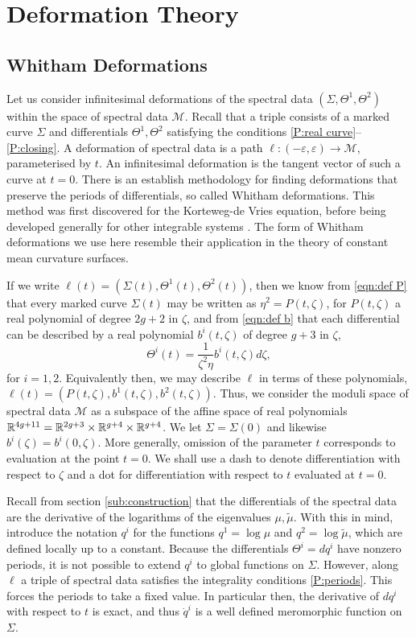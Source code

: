 
\section{Deformation Theory}
\label{sec:Deformation Theory}

\subsection{Whitham Deformations}
Let us consider infinitesimal deformations of the spectral data $(Σ,Θ^1,Θ^2)$  within the space of spectral data $\mathcal{M}$. Recall that a triple consists of a marked curve $Σ$ and differentials $Θ^1, Θ^2$ satisfying the conditions \ref{P:real curve}--\ref{P:closing}.
A deformation of spectral data is a path $\ell:(-ε,ε) \to \mathcal{M}$, parameterised by $t$. An infinitesimal deformation is the tangent vector of such a curve at $t=0$.
There is an establish methodology for finding deformations that preserve the periods of differentials, so called Whitham deformations. This method was first discovered for the Korteweg-de Vries equation\cite{Flaschka1980,Lax1983}, before being developed generally for other integrable systems \cite{Krichever1995}. The form of Whitham deformations we use here resemble their application in the theory of constant mean curvature surfaces\cite{Kilian2015a,Carberry2016}.

If we write $\ell(t) = (Σ(t),Θ^1(t),Θ^2(t))$, then we know from \eqref{eqn:def P} that every marked curve $Σ(t)$ may be written as $η^2 = P(t,ζ)$, for $P(t,ζ)$ a real polynomial of degree $2g+2$ in $ζ$, and from \eqref{eqn:def b} that each differential can be described by a real polynomial $b^i(t,ζ)$ of degree $g+3$ in $ζ$,
\[
Θ^i(t) = \frac{1}{ζ^2η}b^i(t,ζ) dζ,
\]
for $i=1,2$. Equivalently then, we may describe $\ell$ in terms of these polynomials, $\ell(t) = (P(t,ζ),b^1(t,ζ),b^2(t,ζ))$.
Thus, we consider the moduli space of spectral data $\mathcal{M}$ as a subspace of the affine space of real polynomials $\mathbb{R}^{4g+11} = \mathbb{R}^{2g+3}\times\mathbb{R}^{g+4}\times\mathbb{R}^{g+4}$. We let $Σ = Σ(0)$ and likewise $b^i(ζ) = b^i(0,ζ)$.
More generally, omission of the parameter $t$ corresponds to evaluation at the point $t=0$. We shall use a dash to denote differentiation with respect to $ζ$ and a dot for differentiation with respect to $t$ evaluated at $t=0$.

Recall from section \ref{sub:construction} that the differentials of the spectral data are the derivative of the logarithms of the eigenvalues $μ,\tilde{μ}$. With this in mind, introduce the notation $q^i$ for the functions $q^1 = \log μ$ and $q^2 = \log \tilde{μ}$, which are defined locally up to a constant. Because the differentials $Θ^i = dq^i$ have nonzero periods, it is not possible to extend $q^i$ to global functions on $Σ$. However, along $\ell$ a triple of spectral data satisfies the integrality conditions \ref{P:periods}. This forces the periods to take a fixed value. In particular then, the derivative of $dq^i$ with respect to $t$ is exact, and thus $\dot q^i$ is a well defined meromorphic function on $Σ$.

